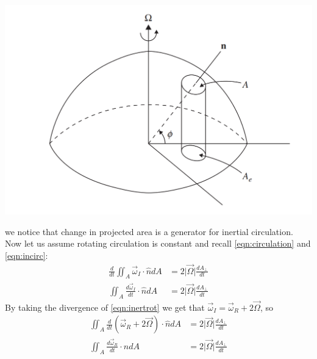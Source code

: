 \begin{minipage}{0.49\textwidth}
    \vspace{-2ex}
    \begin{center}
        \includegraphics[width=\linewidth]{assets/circulation.png}
        \label{fig:circulation}
    \end{center}
\end{minipage}\hspace{0.05\textwidth}
\begin{minipage}{0.49\textwidth}
    we notice that change in projected area is a generator for inertial circulation. Now let us assume rotating circulation is constant and recall \ref{eqn:circulation} and \ref{eqn:incirc}:
    \begin{align*}
        \frac{d}{dt}\iint_A \Vec{\omega}_I\cdot\hat{n}dA &=  2\vert \Vec{\Omega}\vert \frac{dA_\perp}{dt}\\
        \iint_A \frac{d\Vec{\omega}_I}{dt}\cdot\hat{n}dA &= 2\vert \Vec{\Omega}\vert \frac{dA_\perp}{dt}
    \end{align*}
    By taking the divergence of \ref{eqn:inertrot} we get that $\Vec{\omega}_I=\Vec{\omega}_R+2\vec{\Omega}$, so 
    \begin{align*}
        \iint_A \frac{d}{dt}\left(\Vec{\omega}_R+2\Vec{\Omega}\right)\cdot\hat{n}dA &= 2\vert \Vec{\Omega}\vert \frac{dA_\perp}{dt}\\
        \iint_A \frac{d\vec{\omega}_R}{dt}\cdot\hat{n}dA &= 2\vert \Vec{\Omega}\vert \frac{dA_\perp}{dt}
    \end{align*}
    \vspace{1cm}
\end{minipage}
